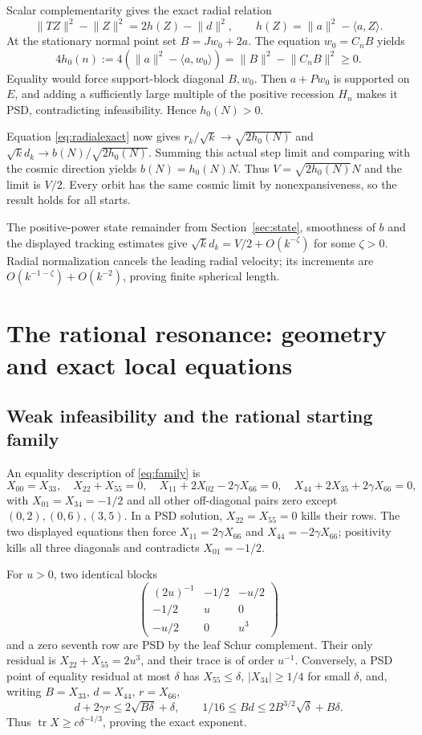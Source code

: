 \documentclass[11pt]{article}
\theoremstyle{remark}\newtheorem{remark}[theorem]{Remark}
\newcommand{\ip}[2]{\langle #1,#2\rangle}\newcommand{\norm}[1]{\lVert #1\rVert}
\newcommand{\tr}{\operatorname{tr}}\newcommand{\dist}{\operatorname{dist}}
\numberwithin{equation}{section}
\begin{document}
Scalar complementarity gives the exact radial relation
\begin{equation}\label{eq:radialexact}
 \norm{TZ}^2-\norm Z^2=2h(Z)-\norm d^2,
 \qquad h(Z)=\norm a^2-\ip aZ.
\end{equation}
At the stationary normal point set $B=Jw_0+2a$. The equation $w_0=C_nB$ yields
\[
 4h_0(n):=4(\norm a^2-\ip a{w_0})=\norm B^2-\norm{C_nB}^2\geq0.
\]
Equality would force support-block diagonal $B,w_0$. Then $a+Pw_0$ is supported on $E$, and adding a sufficiently large multiple of the positive recession $H_n$ makes it PSD, contradicting infeasibility. Hence $h_0(N)>0$.

Equation \eqref{eq:radialexact} now gives $r_k/\sqrt{k}\to\sqrt{2h_0(N)}$ and $\sqrt{k}d_k\to b(N)/\sqrt{2h_0(N)}$. Summing this actual step limit and comparing with the cosmic direction yields $b(N)=h_0(N)N$. Thus $V=\sqrt{2h_0(N)}N$ and the limit is $V/2$. Every orbit has the same cosmic limit by nonexpansiveness, so the result holds for all starts.

The positive-power state remainder from Section~\ref{sec:state}, smoothness of $b$ and the displayed tracking estimates give $\sqrt{k}d_k=V/2+O(k^{-\zeta})$ for some $\zeta>0$. Radial normalization cancels the leading radial velocity; its increments are $O(k^{-1-\zeta})+O(k^{-2})$, proving finite spherical length.

\section{The rational resonance: geometry and exact local equations}
\subsection{Weak infeasibility and the rational starting family}\label{sec:entry}
An equality description of \eqref{eq:family} is
\[
 X_{00}=X_{33},\quad X_{22}+X_{55}=0,\quad
 X_{11}+2X_{02}-2\gamma X_{66}=0,\quad
 X_{44}+2X_{35}+2\gamma X_{66}=0,
\]
with $X_{01}=X_{34}=-1/2$ and all other off-diagonal pairs zero except $(0,2),(0,6),(3,5)$. In a PSD solution, $X_{22}=X_{55}=0$ kills their rows. The two displayed equations then force $X_{11}=2\gamma X_{66}$ and $X_{44}=-2\gamma X_{66}$; positivity kills all three diagonals and contradicts $X_{01}=-1/2$.

For $u>0$, two identical blocks
\[
 \begin{pmatrix}(2u)^{-1}&-1/2&-u/2\\-1/2&u&0\\-u/2&0&u^3\end{pmatrix}
\]
and a zero seventh row are PSD by the leaf Schur complement. Their only residual is $X_{22}+X_{55}=2u^3$, and their trace is of order $u^{-1}$. Conversely, a PSD point of equality residual at most $\delta$ has $X_{55}\leq\delta$, $|X_{34}|\geq1/4$ for small $\delta$, and, writing $B=X_{33}$, $d=X_{44}$, $r=X_{66}$,
\[
 d+2\gamma r\leq2\sqrt{B\delta}+\delta,
 \qquad 1/16\leq Bd\leq2B^{3/2}\sqrt\delta+B\delta.
\]
Thus $\tr X\geq c\delta^{-1/3}$, proving the exact exponent.
\end{document}
